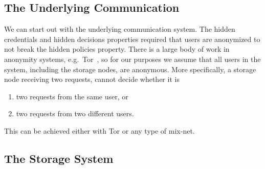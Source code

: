 \subsection{The Underlying Communication}\label{UnderlyingCommunication}

We can start out with the underlying communication system.
The hidden credentials and hidden decisions properties required that users are 
anonymized to not break the hidden policies property.
There is a large body of work in anonymity systems, e.g.\ Tor~\cite{Tor}, so 
for our purposes we assume that all users in the system, including the storage 
nodes, are anonymous.
More specifically, a storage node receiving two requests, cannot decide whether 
it is
\begin{enumerate}
\item two requests from the same user, or
\item two requests from two different users.
\end{enumerate}
This can be achieved either with Tor or any type of mix-net.


\subsection{The Storage System}\label{UnderlyingStorage}

